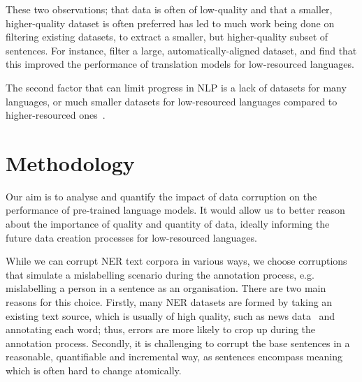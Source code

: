 \documentclass{article}
\newcommand{\mike}[1]{\textcolor{red}{#1}}
\begin{document}
These two observations; that data is often of low-quality and that a smaller, higher-quality dataset is often preferred has led to much work being done on filtering existing datasets, to extract a smaller, but higher-quality subset of sentences. For instance, \citet{abdulmumin2022Separating} filter a large, automatically-aligned dataset, and find that this improved the performance of translation models for low-resourced languages.

The second factor that can limit progress in NLP is a lack of datasets for many languages, or much smaller datasets for low-resourced languages compared to higher-resourced ones~\citep{adelani2022Thousand}.






\section{Methodology}
\label{sec:method}
Our aim is to analyse and quantify the impact of data corruption on the performance of pre-trained language models. It would allow us to better reason about the importance of quality and quantity of data, ideally informing the future data creation processes for low-resourced languages.

While we can corrupt NER text corpora in various ways, we choose corruptions that simulate a mislabelling scenario during the annotation process, e.g. mislabelling a person in a sentence as an organisation. There are two main reasons for this choice. Firstly, many NER datasets are formed by taking an existing text source, which is usually of high quality, such as news data~\citep{adelani2021MasakhaNER} and annotating each word; thus, errors are more likely to crop up during the annotation process. Secondly, it is challenging to corrupt the base sentences in a reasonable, quantifiable and incremental way, as sentences encompass meaning which is often hard to change atomically.
\end{document}
